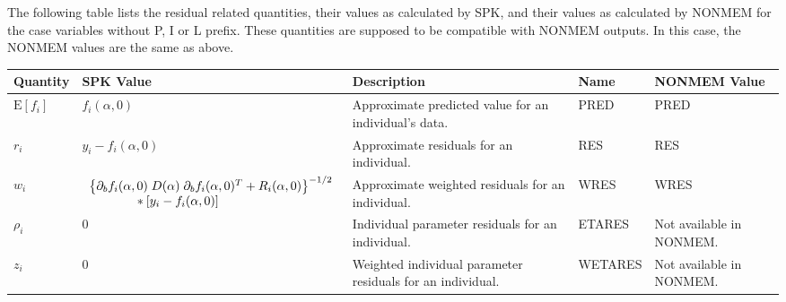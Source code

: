 \documentclass{article}
\begin{document}
\newpage

The following table lists the residual related quantities, their
values as calculated by SPK, and their values as calculated by NONMEM for the 
case variables without P, I or L prefix. These quantities are supposed to be
compatible with NONMEM outputs. In this case, the NONMEM values are the same as
above.

\begin{center}
\begin{tabular}{|p{0.75in}|p{3.25in}|p{1.1in}|p{0.85in}|p{1.0in}|}
\hline
\hline
  {\bf Quantity}
    & {\bf SPK Value}
    & {\bf Description}
    & {\bf Name}
    & {\bf NONMEM Value} \\
  \hline
  \hline
  $\mbox{E} \left[ f_i \right]$
    & $f_i(\alpha, 0)$
    & Approximate predicted value for an individual's data.
    & PRED
    & PRED \\
  \hline
  $r_i$
    & $y_i - f_i(\alpha, 0)$
    & Approximate residuals for an individual.
    & RES
    & RES \\
  \hline
  $w_i$
    & $\begin{array}{l}
        \left\{ \partial_b f_i(\alpha, 0) \;
          D(\alpha) \; \partial_b f_i(\alpha, 0)^T
          + R_i(\alpha, 0) \right\}^{-1/2} \\
        \mbox{\hspace{0.5in}}
        \ast [ y_i - f_i(\alpha, 0) ]
      \end{array} $
    & Approximate weighted residuals for an individual.
    & WRES
    & WRES \\
  \hline
  $\rho_i$
    & $0$
    & Individual parameter residuals for an individual.
    & ETARES
    & Not available in NONMEM. \\
  \hline
  $z_i$
    & $0$
    & Weighted individual parameter residuals for an individual.
    & WETARES
    & Not available in NONMEM. \\
  \hline
  \hline
\end{tabular}
\end{center}

\newpage
\end{document}
